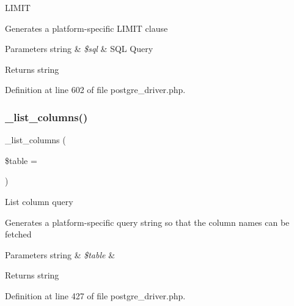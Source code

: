 L\+I\+M\+IT

Generates a platform-\/specific L\+I\+M\+IT clause


\begin{DoxyParams}[1]{Parameters}
string & {\em \$sql} & S\+QL Query \\
\hline
\end{DoxyParams}
\begin{DoxyReturn}{Returns}
string 
\end{DoxyReturn}


Definition at line 602 of file postgre\+\_\+driver.\+php.

\mbox{\label{class_c_i___d_b__postgre__driver_a7ccb7f9c301fe7f0a9db701254142b63}} 
\subsubsection{\texorpdfstring{\_list\_columns()}{\_list\_columns()}}
{\footnotesize\ttfamily \+\_\+list\+\_\+columns (\begin{DoxyParamCaption}\item[{}]{\$table = {\ttfamily \textquotesingle{}\textquotesingle{}} }\end{DoxyParamCaption})\hspace{0.3cm}{\ttfamily [protected]}}

List column query

Generates a platform-\/specific query string so that the column names can be fetched


\begin{DoxyParams}[1]{Parameters}
string & {\em \$table} & \\
\hline
\end{DoxyParams}
\begin{DoxyReturn}{Returns}
string 
\end{DoxyReturn}


Definition at line 427 of file postgre\+\_\+driver.\+php.

\mbox{\label{class_c_i___d_b__postgre__driver_a435c0f3ce54fe7daa178baa8532ebd54}} 
